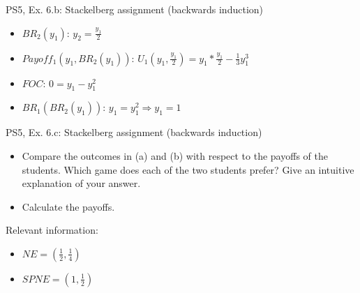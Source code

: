 \begin{frame}{PS5, Ex. 6.b: Stackelberg assignment (backwards induction)}
\begin{multicols}{2}
\begin{itemize}
        \item[4] $BR_2(y_1)$: $y_2 = \frac{y_1}{2}$ \\
        \item[5] $Payoff_1(y_1,BR_2(y_1))$: $U_1(y_1,\frac{y_1}{2}) = y_1*\frac{y_1}{2}-\frac{1}{3}y_1^3$ \\
        \item[6] $FOC$: $0 = y_1 - y_1^2$ \\
        \item[7] $BR_1(BR_2(y_1))$: $y_1 = y_1^2 \Rightarrow y_1=1$ \\
    \end{itemize}
    \vfill\null
  \end{multicols}
\end{frame}

\begin{frame}{PS5, Ex. 6.c: Stackelberg assignment (backwards induction)}
  \begin{itemize}
    \item[(c)] Compare the outcomes in (a) and (b) with respect to the payoffs of the students. Which game does each of the two students prefer? Give an intuitive explanation of your answer.
  \end{itemize}
  \begin{multicols}{2}
    \begin{itemize}
        \item[(Step 1)] Calculate the payoffs.
    \end{itemize}
    \vfill\null \columnbreak
    Relevant information:
    \begin{itemize}
        \item[(a)] \begin{math} NE=\left(\frac{1}{2},\frac{1}{4}\right)\end{math}
        \item[(b)] \begin{math} SPNE=\left(1,\frac{1}{2}\right)\end{math}
    \end{itemize}
  \end{multicols}
\end{frame}
